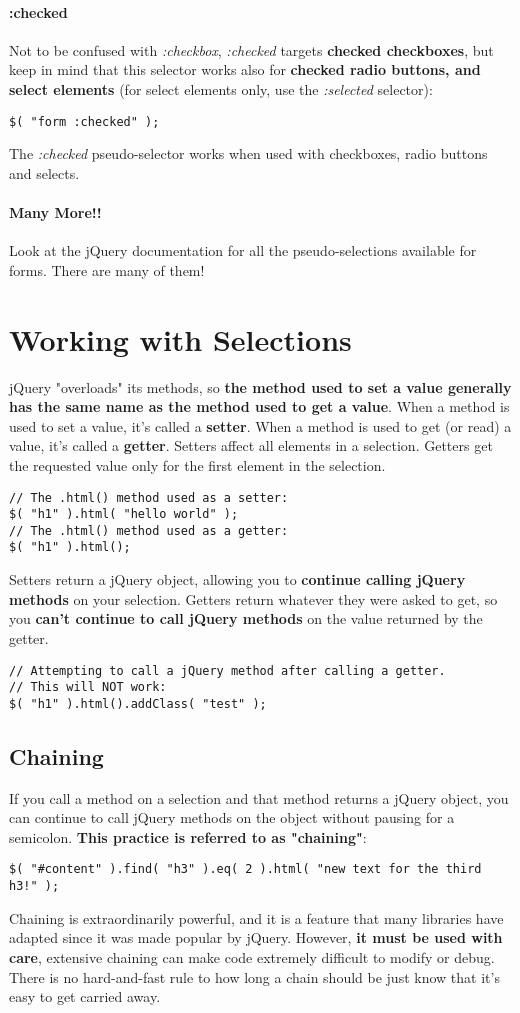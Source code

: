 \documentclass[10pt,letterpaper]{book}
\begin{document}
\paragraph{:checked}
Not to be confused with \textit{:checkbox}, \textit{:checked} targets \textbf{checked checkboxes}, but keep in mind that this selector works also for \textbf{checked radio buttons, and select elements} (for select elements only, use the \textit{:selected} selector):
\begin{lstlisting}
$( "form :checked" );
\end{lstlisting}
The \textit{:checked} pseudo-selector works when used with checkboxes, radio buttons and selects.
\paragraph{Many More!!}
Look at the jQuery documentation for all the pseudo-selections available for forms. There are many of them!

\section{Working with Selections}
jQuery "overloads" its methods, so \textbf{the method used to set a value generally has the same name as the method used to get a value}. When a method is used to set a value, it's called a \textbf{setter}. When a method is used to get (or read) a value, it's called a \textbf{getter}. Setters affect all elements in a selection. Getters get the requested value only for the first element in the selection.
\begin{lstlisting}
// The .html() method used as a setter:
$( "h1" ).html( "hello world" );
// The .html() method used as a getter:
$( "h1" ).html();
\end{lstlisting}
Setters return a jQuery object, allowing you to \textbf{continue calling jQuery methods} on your selection. Getters return whatever they were asked to get, so you \textbf{can't continue to call jQuery methods} on the value returned by the getter.
\begin{lstlisting}
// Attempting to call a jQuery method after calling a getter.
// This will NOT work:
$( "h1" ).html().addClass( "test" );
\end{lstlisting}

\subsection{Chaining}
If you call a method on a selection and that method returns a jQuery object, you can continue to call jQuery methods on the object without pausing for a semicolon. \textbf{This practice is referred to as "chaining"}:
\begin{lstlisting}
$( "#content" ).find( "h3" ).eq( 2 ).html( "new text for the third h3!" );
\end{lstlisting}
Chaining is extraordinarily powerful, and it is a feature that many libraries have adapted since it was made popular by jQuery. However, \textbf{it must be used with care}, extensive chaining can make code extremely difficult to modify or debug. There is no hard-and-fast rule to how long a chain should be just know that it's easy to get carried away.
\end{document}
